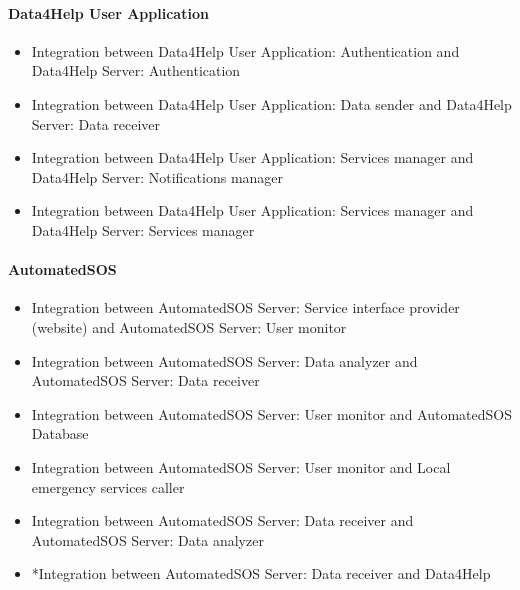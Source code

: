 		\paragraph{Data4Help User Application}
		\begin{itemize}
			\item{Integration between Data4Help User Application: Authentication and Data4Help Server: Authentication}
			\item{Integration between Data4Help User Application: Data sender and Data4Help Server: Data receiver}
			\item{Integration between Data4Help User Application: Services manager and Data4Help Server: Notifications manager}
			\item{Integration between Data4Help User Application: Services manager and Data4Help Server: Services manager}
		\end{itemize}

		\paragraph{AutomatedSOS}
		\begin{itemize}
			\item{Integration between AutomatedSOS Server: Service interface provider (website) and AutomatedSOS Server: User monitor}
			\item{Integration between AutomatedSOS Server: Data analyzer and AutomatedSOS Server: Data receiver}
			\item{Integration between AutomatedSOS Server: User monitor and AutomatedSOS Database}
			\item{Integration between AutomatedSOS Server: User monitor and Local emergency services caller}
			\item{Integration between AutomatedSOS Server: Data receiver and AutomatedSOS Server: Data analyzer}
			\item{*Integration between AutomatedSOS Server: Data receiver and Data4Help}
		\end{itemize}

